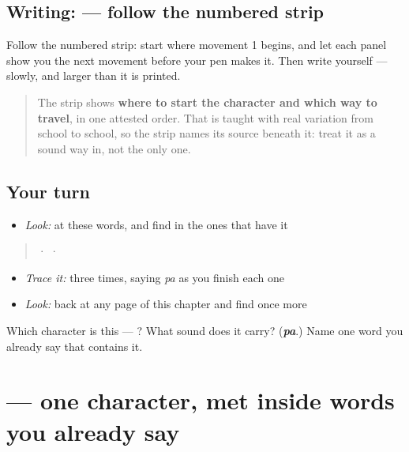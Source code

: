 \subsection*{Writing:  — follow the numbered strip}

Follow the numbered strip: start where movement 1 begins, and let each panel show you the next movement before your pen makes it. Then write  yourself — slowly, and larger than it is printed.

\begin{quote}
The strip shows \textbf{where to start the character and which way to travel}, in one attested order. That is taught with real variation from school to school, so the strip names its source beneath it: treat it as a sound way in, not the only one.
\end{quote}

\subsection*{Your turn}
\begin{itemize}
\raggedright
  \item \emph{Look:} at these words, and find  in the ones that have it
\end{itemize}

\begin{quote}
  ·    ·  
\end{quote}

\begin{itemize}
\raggedright
  \item \emph{Trace it:}  three times, saying \emph{pa} as you finish each one
  \item \emph{Look:} back at any page of this chapter and find  once more
\end{itemize}

\begin{tcolorbox}[breakable,colback=teal!4,colframe=teal!35!black,title={Before you move on}]
Which character is this — ? What sound does it carry? (\emph{\textbf{pa}}.) Name one word you already say that contains it.
\end{tcolorbox}
\section[\texorpdfstring{\ml{േ} (ē)}{േ (ē)}]{ — one character, met inside words you already say}

